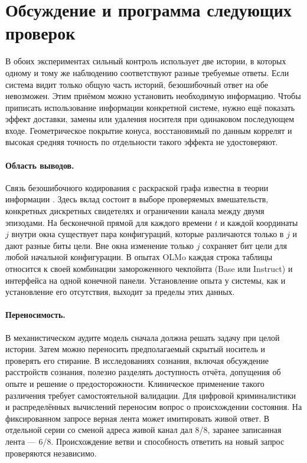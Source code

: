 \section{Обсуждение и программа следующих проверок}
В обоих экспериментах сильный контроль использует две истории, в которых одному и тому же наблюдению соответствуют разные требуемые ответы. Если система видит только общую часть историй, безошибочный ответ на обе невозможен. Этим приёмом можно установить необходимую информацию. Чтобы приписать использование информации конкретной системе, нужно ещё показать эффект доставки, замены или удаления носителя при одинаковом последующем входе. Геометрическое покрытие конуса, восстановимый по данным коррелят и высокая средняя точность по отдельности такого эффекта не удостоверяют.

\paragraph{Область выводов.} Связь безошибочного кодирования с раскраской графа известна в теории информации \cite{witsenhausen,charpenay}. Здесь вклад состоит в выборе проверяемых вмешательств, конкретных дискретных свидетелях и ограничении канала между двумя эпизодами. На бесконечной прямой для каждого времени $t$ и каждой координаты $j$ внутри окна существует пара конфигураций, которые различаются только в $j$ и дают разные биты цели. Вне окна изменение только $j$ сохраняет бит цели для любой начальной конфигурации. В опытах OLMo каждая строка таблицы относится к своей комбинации замороженного чекпойнта (Base или Instruct) и интерфейса на одной конечной панели. Установление опыта у системы, как и установление его отсутствия, выходит за пределы этих данных.

\paragraph{Переносимость.} В механистическом аудите модель сначала должна решать задачу при целой истории. Затем можно переносить предполагаемый скрытый носитель и проверять его стирание. В исследованиях сознания, включая обсуждение расстройств сознания, полезно разделять доступность отчёта, допущения об опыте и решение о предосторожности. Клиническое применение такого различения требует самостоятельной валидации. Для цифровой криминалистики и распределённых вычислений переносим вопрос о происхождении состояния. На фиксированном запросе верная лента может имитировать живой ответ. В отдельной серии со сменой адреса живой канал дал 8/8, заранее записанная лента --- 6/8. Происхождение ветви и способность ответить на новый запрос проверяются независимо.

